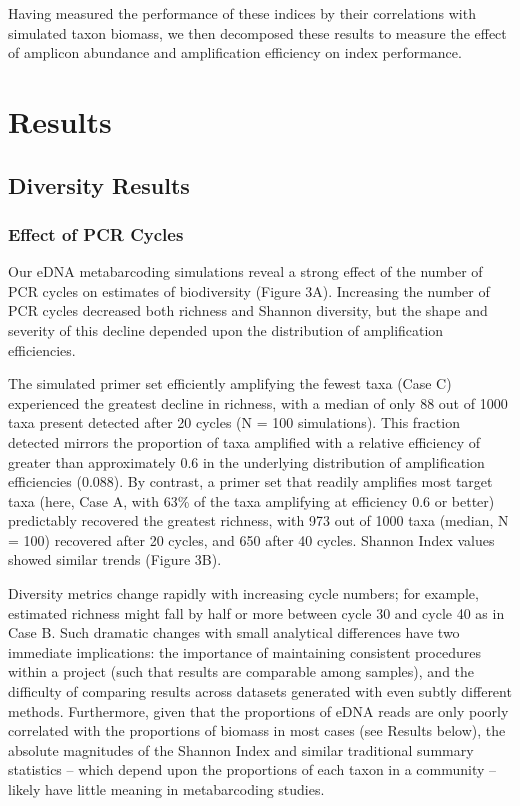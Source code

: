 \documentclass[fleqn,11pt,lineno]{wlscirep}
\begin{document}
Having measured the performance of these indices by their correlations with simulated taxon biomass, we then decomposed these results to measure the effect of amplicon abundance and amplification efficiency on index performance.

\vspace{2em}

\section{Results}\label{results}

\subsection{Diversity Results}

\subsubsection*{Effect of PCR Cycles}

Our eDNA metabarcoding simulations reveal a strong effect of the number of PCR cycles on estimates of biodiversity (Figure 3A). Increasing the number of PCR cycles decreased both richness and Shannon diversity, but the shape and severity of this decline depended upon the distribution of amplification efficiencies. 

The simulated primer set efficiently amplifying the fewest taxa (Case C) experienced the greatest decline in richness, with a median of only 88 out of 1000 taxa present detected after 20 cycles (N = 100 simulations). This fraction detected mirrors the proportion of taxa amplified with a relative efficiency of greater than approximately 0.6 in the underlying distribution of amplification efficiencies (0.088). By contrast, a primer set that readily amplifies most target taxa (here, Case A, with 63\% of the taxa amplifying at efficiency 0.6 or better) predictably recovered the greatest richness, with 973 out of 1000 taxa (median, N = 100) recovered after 20 cycles, and 650 after 40 cycles. Shannon Index values showed similar trends (Figure 3B). 

Diversity metrics change rapidly with increasing cycle numbers; for example, estimated richness might fall by half or more between cycle 30 and cycle 40 as in Case B. Such dramatic changes with small analytical differences have two immediate implications: the importance of maintaining consistent procedures within a project (such that results are comparable among samples), and the difficulty of comparing results across datasets generated with even subtly different methods. Furthermore, given that the proportions of eDNA reads are only poorly correlated with the proportions of biomass in most cases (see Results below), the absolute magnitudes of the Shannon Index and similar traditional summary statistics -- which depend upon the proportions of each taxon in a community -- likely have little meaning in metabarcoding studies.
\end{document}
